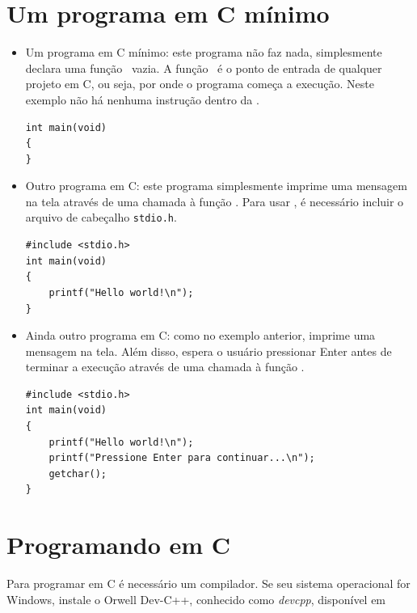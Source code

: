 \section{Um programa em C mínimo}


\begin{itemize}

\item Um programa em C mínimo: este programa não faz nada, simplesmente declara uma função \MAIN\ vazia. A função \MAIN\ é o ponto de entrada de qualquer projeto em C, ou seja, por onde o programa começa a execução. Neste exemplo não há nenhuma instrução dentro da \MAIN.

\begin{lstlisting}
int main(void)
{
}
\end{lstlisting}


\item Outro programa em C: este programa simplesmente imprime uma mensagem na tela através de uma chamada à função \PRINTF. Para usar \PRINTF, é necessário incluir o arquivo de cabeçalho {\tt stdio.h}.

\begin{lstlisting}
#include <stdio.h>
int main(void)
{
    printf("Hello world!\n");
}
\end{lstlisting}


\item Ainda outro programa em C: como no exemplo anterior, imprime uma mensagem na tela. Além disso, espera o usuário pressionar Enter antes de terminar a execução através de uma chamada à função \GETCHAR.

\begin{lstlisting}
#include <stdio.h>
int main(void)
{
    printf("Hello world!\n");
    printf("Pressione Enter para continuar...\n");
    getchar();
}
\end{lstlisting}

\end{itemize}


\section{Programando em C}

Para programar em C é necessário um compilador. Se seu sistema operacional for Windows, instale o Orwell Dev-C++, conhecido como {\it devcpp}, disponível em

